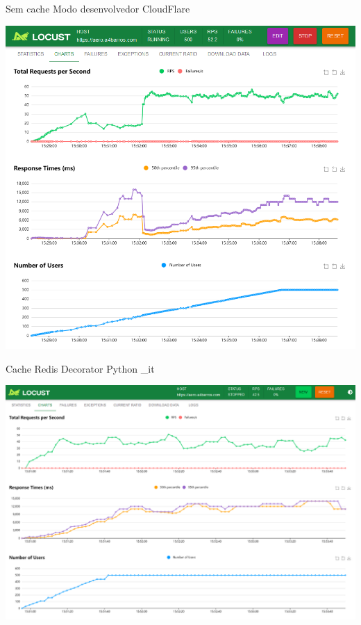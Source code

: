 \documentclass{beamer}
\begin{document}
\begin{frame}{Sem cache}
    Modo desenvolvedor CloudFlare \\
    \pause
    \begin{center}
    \includegraphics[width=0.8\linewidth]{img/locust-no-cache.png}
    \end{center}
\end{frame}

\begin{frame}{Cache Redis}
    Decorator Python \@cache\_it \\
    \pause
    \begin{center}
    \includegraphics[width=0.8\linewidth]{img/locust-cache-redis.png}
    \end{center}
\end{frame}
\end{document}
